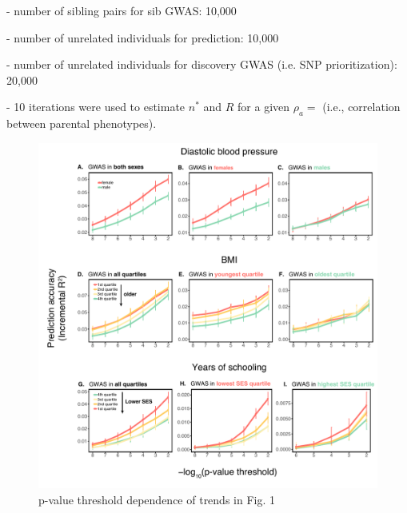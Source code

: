 \documentclass[hidelinks, 12pt]{article}
\begin{document}
- number of sibling pairs for sib GWAS: 10,000

- number of unrelated individuals for prediction: 10,000

- number of unrelated individuals for discovery GWAS (i.e. SNP prioritization): 20,000

- 10 iterations were used to estimate $n^*$ and $R$ for a given $\rho_a=$ (i.e., correlation between parental phenotypes).

\pagebreak

\begin{figure}[h!]
\includegraphics[width=\textwidth]{./supp_figures/fig1_Rsweep.pdf}
\caption{p-value threshold dependence of trends in Fig. 1}
\centering
\end{figure}
\end{document}
